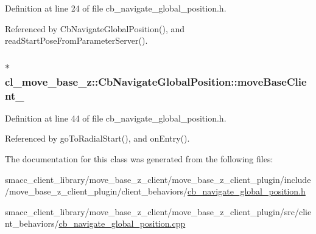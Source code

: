 Definition at line 24 of file cb\+\_\+navigate\+\_\+global\+\_\+position.\+h.



Referenced by Cb\+Navigate\+Global\+Position(), and read\+Start\+Pose\+From\+Parameter\+Server().

\subsubsection[{\texorpdfstring{move\+Base\+Client\+\_\+}{moveBaseClient_}}]{$\ast$ cl\+\_\+move\+\_\+base\+\_\+z\+::\+Cb\+Navigate\+Global\+Position\+::move\+Base\+Client\+\_\+\hspace{0.3cm}{\ttfamily [private]}}\hypertarget{classcl__move__base__z_1_1CbNavigateGlobalPosition_a460d6b43834cb52baa94d22cd3a6fd2b}{}\label{classcl__move__base__z_1_1CbNavigateGlobalPosition_a460d6b43834cb52baa94d22cd3a6fd2b}


Definition at line 44 of file cb\+\_\+navigate\+\_\+global\+\_\+position.\+h.



Referenced by go\+To\+Radial\+Start(), and on\+Entry().



The documentation for this class was generated from the following files\+:\begin{DoxyCompactItemize}
\item 
smacc\+\_\+client\+\_\+library/move\+\_\+base\+\_\+z\+\_\+client/move\+\_\+base\+\_\+z\+\_\+client\+\_\+plugin/include/move\+\_\+base\+\_\+z\+\_\+client\+\_\+plugin/client\+\_\+behaviors/\hyperlink{cb__navigate__global__position_8h}{cb\+\_\+navigate\+\_\+global\+\_\+position.\+h}\item 
smacc\+\_\+client\+\_\+library/move\+\_\+base\+\_\+z\+\_\+client/move\+\_\+base\+\_\+z\+\_\+client\+\_\+plugin/src/client\+\_\+behaviors/\hyperlink{cb__navigate__global__position_8cpp}{cb\+\_\+navigate\+\_\+global\+\_\+position.\+cpp}\end{DoxyCompactItemize}
